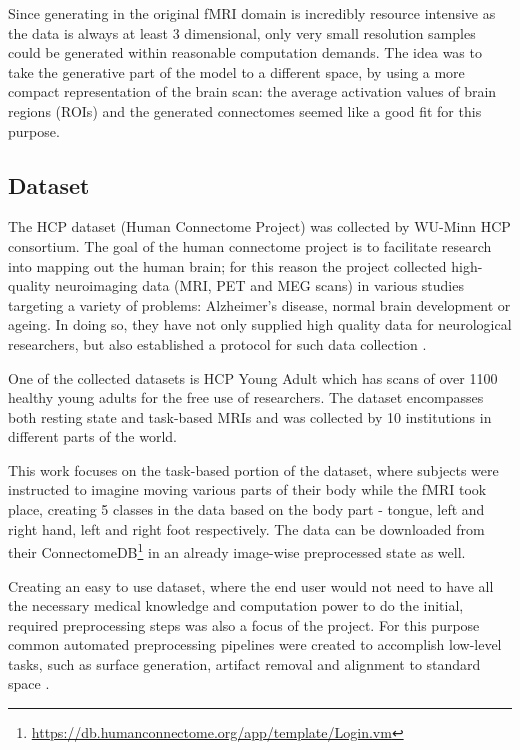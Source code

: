 	
	Since generating in the original fMRI domain is incredibly resource intensive as the data is always at least 3 dimensional, only very small resolution samples could be generated within reasonable computation demands. The idea was to take the generative part of the model to a different space, by using a more compact representation of the brain scan: the average activation values of brain regions (ROIs) and the generated connectomes seemed like a good fit for this purpose.

	\subsection{Dataset}
	\label{sec:HCP}
	
	The HCP dataset (Human Connectome Project) was collected by WU-Minn HCP consortium. The goal of the human connectome project is to facilitate research into mapping out the human brain; for this reason the project collected high-quality neuroimaging data (MRI, PET and MEG scans) in various studies targeting a variety of problems: Alzheimer's disease, normal brain development or ageing. In doing so, they have not only supplied high quality data for neurological researchers, but also established a protocol for such data collection \cite{van2012human}.
	
	One of the collected datasets is HCP Young Adult which has scans of over 1100 healthy young adults for the free use of researchers. The dataset encompasses both resting state and task-based MRIs and was collected by 10 institutions in different parts of the world. 
	
	This work focuses on the task-based portion of the dataset, where subjects were instructed to imagine moving various parts of their body while the fMRI took place, creating 5 classes in the data based on the body part - tongue, left and right hand, left and right foot respectively. The data can be downloaded from their ConnectomeDB\footnote{\url{https://db.humanconnectome.org/app/template/Login.vm}} in an already image-wise preprocessed state as well. 
	
	Creating an easy to use dataset, where the end user would not need to have all the necessary medical knowledge and computation power to do the initial, required preprocessing steps was also a focus of the project. For this purpose common automated preprocessing pipelines were created to accomplish low-level tasks, such as surface generation, artifact removal and alignment to standard space \cite{glasser2013minimal}.
	
